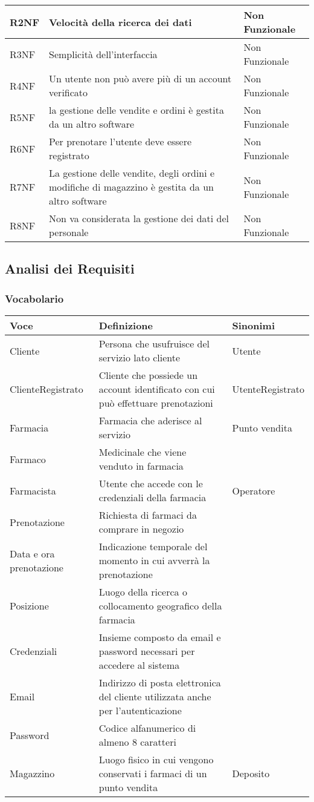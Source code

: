 \begin{tabular} {|P{1.5cm}|P{12.5cm}|P{3cm}|}
  R2NF & Velocità della ricerca dei dati & Non Funzionale\\
\hline
  R3NF & Semplicità dell'interfaccia & Non Funzionale\\
\hline
  R4NF & Un utente non può avere più di un account verificato & Non Funzionale\\
\hline
  R5NF & la gestione delle vendite e ordini è gestita da un altro software & Non Funzionale\\
\hline
  R6NF & Per prenotare l'utente deve essere registrato & Non Funzionale\\
\hline
  R7NF & La gestione delle vendite, degli ordini e modifiche di magazzino è gestita da un altro software & Non Funzionale\\
\hline
  R8NF & Non va considerata la gestione dei dati del personale & Non Funzionale \\
\hline
\end{tabular}

\subsection{Analisi dei Requisiti}
\subsubsection{Vocabolario}

\begin{tabular} {|P{3.5cm}|P{10.5cm}|P{3cm}|}
\hline
  \textbf{Voce} & \textbf{Definizione} & \textbf{Sinonimi}\\
\hline
  Cliente & Persona che usufruisce del servizio lato cliente & Utente \\
\hline
  ClienteRegistrato & Cliente che possiede un account identificato con cui può effettuare prenotazioni & UtenteRegistrato \\
\hline
  Farmacia & Farmacia che aderisce al servizio & Punto vendita\\
\hline
  Farmaco & Medicinale che viene venduto in farmacia & \\
\hline
  Farmacista & Utente che accede con le credenziali della farmacia & Operatore \\
\hline
  Prenotazione & Richiesta di farmaci da comprare in negozio & \\
\hline
  Data e ora prenotazione & Indicazione temporale del momento in cui avverrà la prenotazione & \\
\hline
  Posizione & Luogo della ricerca o collocamento geografico della farmacia & \\
\hline
  Credenziali & Insieme composto da email e password necessari per accedere al sistema&\\
\hline
  Email & Indirizzo di posta elettronica del cliente utilizzata anche per l'autenticazione &\\
\hline
  Password & Codice alfanumerico di almeno 8 caratteri &\\
\hline
  Magazzino & Luogo fisico in cui vengono conservati i farmaci di un punto vendita & Deposito \\
\hline
\end{tabular}

